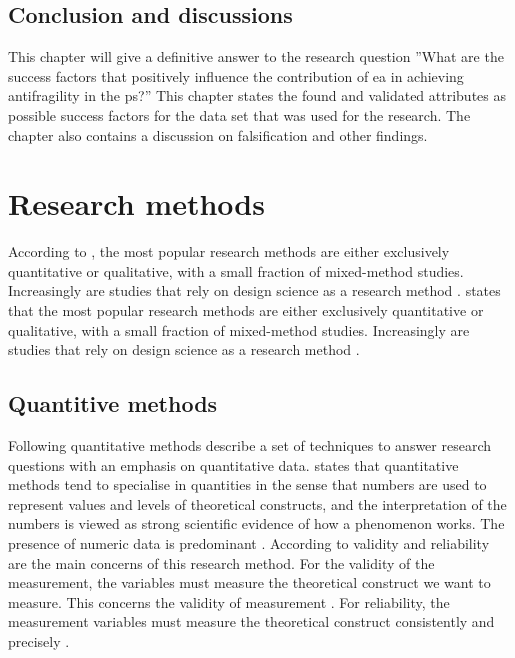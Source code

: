 \subsection{Conclusion and discussions}
\label{sub:conclusionanddiscussions}
This chapter will give a definitive answer to the research question ''What are the success factors that positively influence the contribution of \acrlong{ea} in achieving \gls{antifragility} in the \gls{ps}?'' This chapter states the found and validated attributes as possible success factors for the data set that was used for the research. The chapter also contains a discussion on falsification and other findings.

\section{Research methods}
\label{sec:researchtype}
According to \textcite[p.~62]{Recker2012}, the most popular research methods are either exclusively quantitative or qualitative, with a small fraction of mixed-method studies. Increasingly are studies that rely on design science as a research method \parencite[p.~62]{Recker2012}. \textcite[p.~62]{Recker2012} states that the most popular research methods are either exclusively quantitative or qualitative, with a small fraction of mixed-method studies. Increasingly are studies that rely on design science as a research method \parencite[p.~62]{Recker2012}.

\subsection{Quantitive methods}
\label{sub:quantitivemethods}
Following \textcite[p.~62]{Recker2012} quantitative methods describe a set of techniques to answer research questions with an emphasis on quantitative data. \textcite[p.~63]{Recker2012} states that quantitative methods tend to specialise in quantities in the sense that numbers are used to represent values and levels of theoretical constructs, and the interpretation of the numbers is viewed as strong scientific evidence of how a phenomenon works. The presence of numeric data is predominant \parencite[p.~62]{Recker2012}. According to \textcite[p.~64]{Recker2012} validity and reliability are the main concerns of this research method. For the validity of the measurement, the variables must measure the theoretical construct we want to measure. This concerns the validity of measurement \parencite[p.~64]{Recker2012}. For reliability, the measurement variables must measure the theoretical construct consistently and precisely \parencite[p.~64--65]{Recker2012}.

